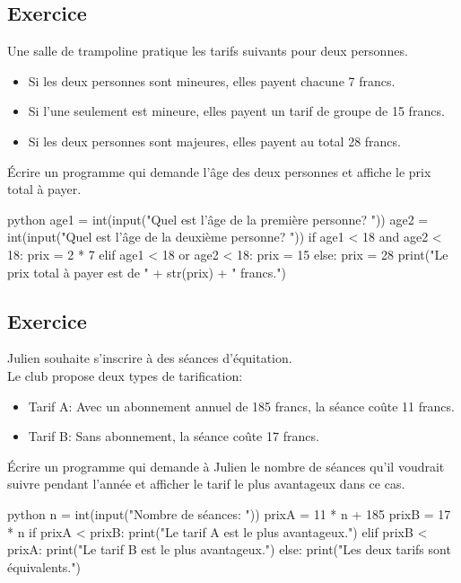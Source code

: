 \documentclass[a4paper,11pt]{article}
\begin{document}
\subsection{Exercice}
Une salle de trampoline pratique les tarifs suivants pour deux personnes.\\
\begin{itemize}
    \item Si les deux personnes sont mineures, elles payent chacune 7 francs.
    \item Si l'une seulement est mineure, elles payent un tarif de groupe de 15 francs.
    \item Si les deux personnes sont majeures, elles payent au total 28 francs.
\end{itemize}
Écrire un programme qui demande l'âge des deux personnes et affiche le prix total à payer.
\begin{solution}
\begin{code}[interactive]{python}
age1 = int(input("Quel est l'âge de la première personne? "))
age2 = int(input("Quel est l'âge de la deuxième personne? "))
if age1 < 18 and age2 < 18:
    prix = 2 * 7
elif age1 < 18 or age2 < 18:
    prix = 15
else:
    prix = 28
print("Le prix total à payer est de " + str(prix) + " francs.")
\end{code}
\end{solution}

\subsection{Exercice}
Julien souhaite s'inscrire à des séances d'équitation.\\
Le club propose deux types de tarification:
\begin{itemize}
    \item Tarif A: Avec un abonnement annuel de 185 francs, la séance coûte 11 francs.
    \item Tarif B: Sans abonnement, la séance coûte 17 francs.
\end{itemize}
Écrire un programme qui demande à Julien le nombre de séances qu'il voudrait suivre pendant l'année et afficher le tarif le plus avantageux dans ce cas.
\begin{solution}
\begin{code}[interactive]{python}
n = int(input("Nombre de séances: "))
prixA = 11 * n + 185
prixB = 17 * n
if prixA < prixB:
    print("Le tarif A est le plus avantageux.")
elif prixB < prixA:
    print("Le tarif B est le plus avantageux.")
else:
    print("Les deux tarifs sont équivalents.")
\end{code}
\end{solution}
\end{document}
